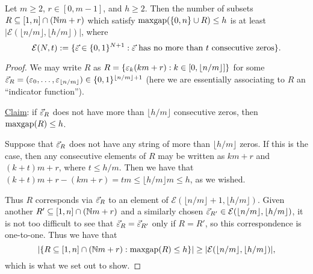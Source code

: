 





\begin{lemma} \label{lem:concentration to tuples}
Let $m\ge 2$, $r\in [0,m-1]$, and $h\ge 2$.
Then the number of subsets $R\subseteq [1,n]\cap (\mathbb{N} m +r)$ which satisfy $\operatorname{maxgap}(\{0,n\}\cup R) \le h$ is at least $|\mathcal{E}(\lfloor n/m \rfloor,\lfloor h/m \rfloor)|$, where
\[ \mathcal{E}(N,t) := \{ \vec{\varepsilon}\in \{0,1\}^{N+1}: \vec{\varepsilon} \textrm{ has no more than $t$ consecutive zeros}\}. \]
\end{lemma}
\begin{proof}
We may write $R$ as $R = \{ \varepsilon_k(km+r): k\in [0,\lfloor n/m \rfloor] \}$ for some $\vec{\varepsilon}_R = (\varepsilon_0,\dots,\varepsilon_{\lfloor n/m \rfloor}) \in \{0,1\}^{\lfloor n/m \rfloor+1}$ (here we are essentially associating to $R$ an ``indicator function'').

\underline{Claim}: if $\vec{\varepsilon}_R$ does not have more than $\lfloor h/m \rfloor$ consecutive zeros, then $\operatorname{maxgap}(R) \le h$.

Suppose that $\vec{\varepsilon}_R$ does not have any string of more than $\lfloor h/m \rfloor$ zeros.
If this is the case, then any consecutive elements of $R$ may be written as $km+r$ and $(k+t)m+r$, where $t\le h/m$.
Then we have that $(k+t)m+r - (km+r) = tm \le \lfloor h/m \rfloor m \le h$, as we wished.

Thus $R$ corresponds via $\vec{\varepsilon}_R$ to an element of $\mathcal{E}(\lfloor n/m \rfloor+1,\lfloor h/m \rfloor)$.
Given another $R'\subseteq [1,n]\cap (\mathbb{N} m+ r)$ and a similarly chosen $\vec{\varepsilon}_{R'}\in \mathcal{E}(\lfloor n/m \rfloor,\lfloor h/m \rfloor)$, it is not too difficult to see that $\vec{\varepsilon}_R = \vec{\varepsilon}_{R'}$ only if $R=R'$, so this correspondence is one-to-one.
Thus we have that 
\[ |\{ R\subseteq [1,n]\cap (\mathbb{N} m + r): \operatorname{maxgap}(R)\le h\}| 
\ge |\mathcal{E}(\lfloor n/m \rfloor, \lfloor h/m \rfloor)|, \]
which is what we set out to show.
\end{proof}

